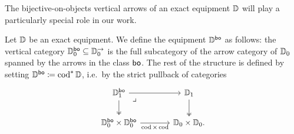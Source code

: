 \documentclass[11pt,oneside,article]{memoir}
\begin{document}
The bijective-on-objects vertical arrows of an exact equipment $\mathbb{D}$ will play a particularly special role in our work. 
\begin{definition}
   Let $\mathbb{D}$ be an exact equipment. We define the equipment $\mathbb{D}^{\mathsf{bo}}$ as follows: the
   vertical category $\mathbb{D}_0^{\mathsf{bo}}\subseteq\mathbb{D}_0^{\rightarrow}$ is the full subcategory of the arrow category of
   $\mathbb{D}_0$ spanned by the arrows in the class $\mathsf{bo}$. The rest of the structure is defined by
   setting $\mathbb{D}^{\mathsf{bo}}\coloneqq\operatorname{cod}^*\mathbb{D}$, i.e.\ by the strict pullback of categories
   \[ \begin{tikzcd}[column sep=large]
      \dcat{D}_1^{\bo} \ar[r] \ar[d, two heads] \ar[dr,phantom,"\lrcorner" very near start]
         & \dcat{D}_1 \ar[d, two heads] \\
      \dcat{D}_0^{\bo}\times\dcat{D}_0^{\bo} \ar[r,"\cod\times\cod"']
         & \dcat{D}_0\times\dcat{D}_0.
   \end{tikzcd} \]
\end{definition}
\end{document}
